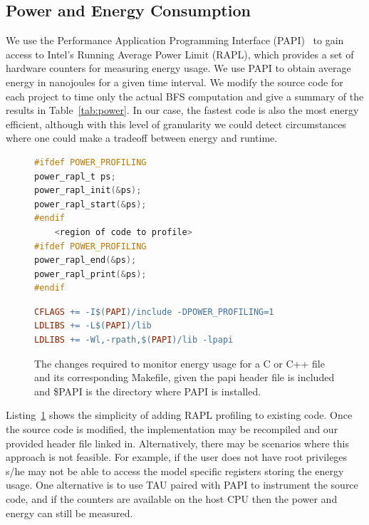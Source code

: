 \documentclass[conference]{IEEEtran}
\begin{document}
\subsection{Power and Energy Consumption}
We use the Performance Application Programming Interface (PAPI)~\cite{Browne:2000:PAPI} to gain access to Intel's Running Average Power Limit (RAPL), which provides a set of hardware counters for measuring energy usage. We use PAPI to obtain average energy in nanojoules for a given time interval. We modify the source code for each project to time only the actual BFS computation and give a summary of the results in Table~\ref{tab:power}. In our case, the fastest code is also the most energy efficient, although with this level of granularity we could detect circumstances where one could make a tradeoff between energy and runtime.
\begin{figure}
\begin{lstlisting}[language=C, frame=single]
#ifdef POWER_PROFILING
power_rapl_t ps;
power_rapl_init(&ps);
power_rapl_start(&ps);
#endif
	<region of code to profile>
#ifdef POWER_PROFILING
power_rapl_end(&ps);
power_rapl_print(&ps);
#endif
\end{lstlisting}
\begin{lstlisting}[language=make,  basicstyle=\footnotesize]
CFLAGS += -I$(PAPI)/include -DPOWER_PROFILING=1
LDLIBS += -L$(PAPI)/lib
LDLIBS += -Wl,-rpath,$(PAPI)/lib -lpapi
\end{lstlisting}
\caption{The changes required to monitor energy usage for a C or C++ file and its corresponding Makefile, given the papi header file is included and \$PAPI is the directory where PAPI is installed.}
\label{lst:RAPL}
\end{figure}

Listing~\ref{lst:RAPL} shows the simplicity of adding RAPL profiling to existing code. Once the source code is modified, the implementation may be recompiled and our provided header file linked in. Alternatively, there may be scenarios where this approach is not feasible. For example, if the user does not have root privileges s/he may not be able to access the model specific registers storing the energy usage. One alternative is to use TAU paired with PAPI to instrument the source code, and if the counters are available on the host CPU then the power and energy can still be measured.
\end{document}
